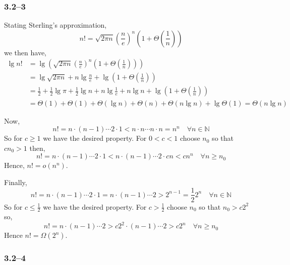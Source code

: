 \subsubsection*{3.2--3}

Stating Sterling's approximation,
\begin{equation*}
	n! = \sqrt{2\pi n}\left(\frac{n}{e}\right)^{n}\left(1+\Theta\left(\frac{1}{n}\right)\right)
\end{equation*}
we then have,
\begin{equation*}
	\begin{aligned}
		\lg n! &= \lg\left(\sqrt{2\pi n}\left(\frac{n}{e}\right)^{n}\left(1+\Theta\left(\frac{1}{n}\right)\right)\right)\\
		&= \lg \sqrt{2\pi n} + n\lg \frac{n}{e} + \lg\left(1+\Theta\left(\frac{1}{n}\right)\right)\\
		&= \frac{1}{2}+\frac{1}{2}\lg\pi + \frac{1}{2}\lg n + n\lg\frac{1}{e} + n\lg n + \lg\left(1+\Theta\left(\frac{1}{n}\right)\right)\\
		&= \Theta(1) + \Theta(1) + \Theta(\lg n) + \Theta(n) + \Theta(n\lg n) + \lg\Theta(1) = \Theta(n\lg n)
	\end{aligned}
\end{equation*}

Now,
\begin{equation*}
	n! = n\cdot(n-1)\cdots2\cdot1 < n\cdot n\cdots n\cdot n = n^{n}\quad\forall n\in\mathbb{N}
\end{equation*}
So for $c\geq 1$ we have the desired property. For $0<c<1$ choose $n_{0}$ so that $cn_{0} > 1$ then,
\begin{equation*}
	n! = n\cdot(n-1)\cdots2\cdot1 < n\cdot(n-1)\cdots2\cdot cn < c n^{n}\quad\forall n\geq n_{0}
\end{equation*}
Hence, $n!=o(n^{n})$.

Finally,
\begin{equation*}
	n! = n\cdot(n-1)\cdots 2\cdot1 = n\cdot(n-1)\cdots 2 > 2^{n-1}=\frac{1}{2}2^{n}\quad\forall n\in\mathbb{N}
\end{equation*}
So for $c\leq\frac{1}{2}$ we have the desired property. For $c>\frac{1}{2}$ choose $n_{0}$ so that $n_{0}>c2^{2}$ so,
\begin{equation*}
	n! = n\cdot(n-1)\cdots2>c2^{2}\cdot(n-1)\cdots2>c2^{n}\quad\forall n\geq n_{0}
\end{equation*}
Hence $n!=\Omega(2^{n})$.

\subsubsection*{3.2--4}

